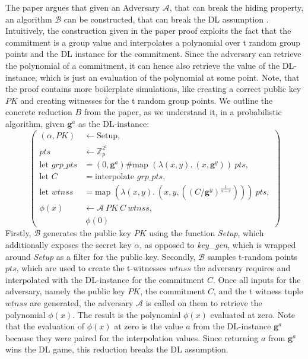 The paper argues that given an Adversary $\mathcal{A}$, that can break the hiding property, an algorithm $\mathcal{B}$ can be constructed, that can break the DL assumption \parencite{KZG}. Intuitively, the construction given in the paper proof exploits the fact that the commitment is a group value and interpolates a polynomial over t random group points and the DL instance for the commitment. Since the adversary can retrieve the polynomial of a commitment, it can hence also retrieve the value of the DL-instance, which is just an evaluation of the polynomial at some point. Note, that the proof contains more boilerplate simulations, like creating a correct public key $PK$ and creating witnesses for the t random group points. We outline the concrete reduction $B$ from the paper, as we understand it, in a probabilistic algorithm, given $\mathbf{g}^a$ as the DL-instance:
\begin{equation*}
    \left(
        \begin{aligned}
            (\alpha,PK) & \leftarrow \text{Setup}, \\
            pts & \leftarrow \mathbb{Z}_p^{2^t}\\
            \text{let } grp\_pts &= (0,\mathbf{g}^a)\#\text{map } (\lambda (x,y).\ (x,\mathbf{g}^y))\ pts,\\
            \text{let } C &= \text{interpolate } grp\_pts,\\ 
            \text{let } wtnss &= \text{map } (\lambda (x,y).\ (x,y, ((C/\mathbf{g}^y)^{\frac{1}{\alpha-x}})))\ pts,\\
            \phi(x) & \leftarrow \mathcal{A}\ PK \ C\ wtnss, \\
            & \ \phi(0)
        \end{aligned}
    \right)
\end{equation*}
Firstly, $\mathcal{B}$ generates the public key $PK$ using the function \textit{Setup}, which additionally exposes the secret key $\alpha$, as opposed to \textit{key\_gen}, which is wrapped around \textit{Setup} as a filter for the public key. Secondly, $\mathcal{B}$ samples t-random points $pts$, which are used to create the t-witnesses $wtnss$ the adversary requires and interpolated with the DL-instance for the commitment $C$. Once all inputs for the adversary, namely the public key $PK$, the commitment $C$, and the t witness tuple $wtnss$ are generated, the adversary $\mathcal{A}$ is called on them to retrieve the polynomial $\phi(x)$. The result is the polynomial $\phi(x)$ evaluated at zero. Note that the evaluation of $\phi(x)$ at zero is the value $a$ from the DL-instance $\mathbf{g}^a$ because they were paired for the interpolation values. Since returning $a$ from $\mathbf{g}^a$ wins the DL game, this reduction breaks the DL assumption.

